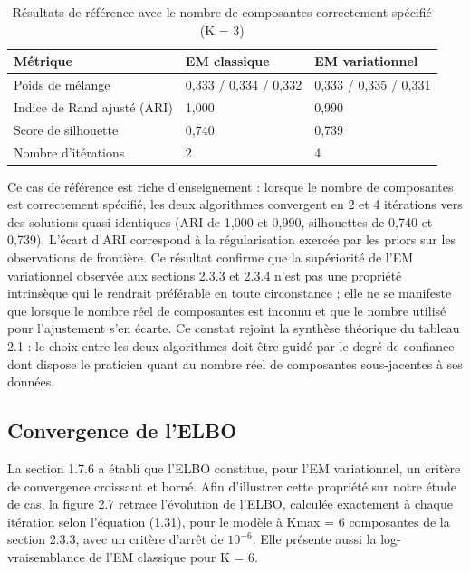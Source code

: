 \begin{table}[H]
\centering
\small
\setlength{\tabcolsep}{0.14cm}
\begin{tabular}{|p{4.84cm}|p{4.84cm}|p{4.84cm}|}
\hline
\textbf{Métrique} & \textbf{EM classique} & \textbf{EM variationnel} \\
\hline
Poids de mélange & 0,333 / 0,334 / 0,332 & 0,333 / 0,335 / 0,331 \\
\hline
Indice de Rand ajusté (ARI) & 1,000 & 0,990 \\
\hline
Score de silhouette & 0,740 & 0,739 \\
\hline
Nombre d'itérations & 2 & 4 \\
\hline
\end{tabular}
\caption{Résultats de référence avec le nombre de composantes correctement spécifié (K = 3)}
\label{tab:2_10}
\end{table}
Ce cas de référence est riche d'enseignement : lorsque le nombre de composantes est correctement spécifié, les deux algorithmes convergent en 2 et 4 itérations vers des solutions quasi identiques (ARI de 1,000 et 0,990, silhouettes de 0,740 et 0,739). L'écart d'ARI correspond à la régularisation exercée par les priors sur les observations de frontière. Ce résultat confirme que la supériorité de l'EM variationnel observée aux sections 2.3.3 et 2.3.4 n'est pas une propriété intrinsèque qui le rendrait préférable en toute circonstance ; elle ne se manifeste que lorsque le nombre réel de composantes est inconnu et que le nombre utilisé pour l'ajustement s'en écarte. Ce constat rejoint la synthèse théorique du tableau 2.1 : le choix entre les deux algorithmes doit être guidé par le degré de confiance dont dispose le praticien quant au nombre réel de composantes sous-jacentes à ses données.

\subsection{Convergence de l'ELBO}
La section 1.7.6 a établi que l'ELBO constitue, pour l'EM variationnel, un critère de convergence croissant et borné. Afin d'illustrer cette propriété sur notre étude de cas, la figure 2.7 retrace l'évolution de l'ELBO, calculée exactement à chaque itération selon l'équation (1.31), pour le modèle à Kmax = 6 composantes de la section 2.3.3, avec un critère d'arrêt de $10^{-6}$. Elle présente aussi la log-vraisemblance de l'EM classique pour K = 6.

